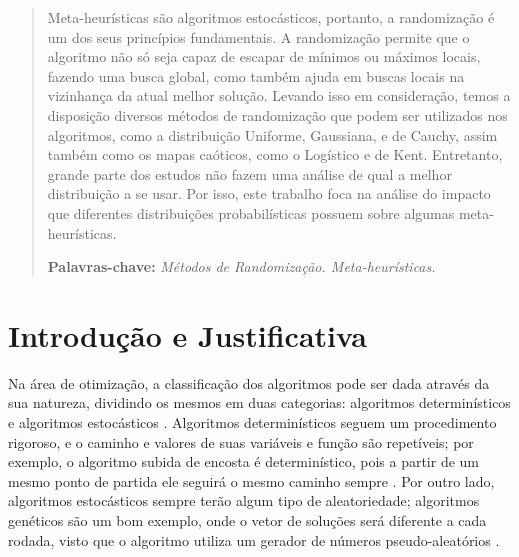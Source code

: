 \documentclass[11pt]{article}
\begin{document}
\begin{abstract}

Meta-heurísticas são algoritmos estocásticos, portanto, a randomização é um dos seus princípios fundamentais. A randomização permite que o algoritmo não só seja capaz de escapar de mínimos ou máximos locais, fazendo uma busca global, como também ajuda em buscas locais na vizinhança da atual melhor solução. Levando isso em consideração, temos a disposição diversos métodos de randomização que podem ser utilizados nos algoritmos, como a distribuição Uniforme, Gaussiana, e de Cauchy, assim também como os mapas caóticos, como o Logístico e de Kent. Entretanto, grande parte dos estudos não fazem uma análise de qual a melhor distribuição a se usar. Por isso, este trabalho foca na análise do impacto que diferentes distribuições probabilísticas possuem sobre algumas meta-heurísticas.

\textbf{Palavras-chave:} \textit{Métodos de Randomização. Meta-heurísticas.}
\end{abstract}

\section{Introdução e Justificativa}
\label{sec:int}


Na área de otimização, a classificação dos algoritmos pode ser dada através da sua natureza, dividindo os mesmos em duas categorias: algoritmos determinísticos e algoritmos estocásticos \cite{yang}. Algoritmos determinísticos seguem um procedimento rigoroso, e o caminho e valores de suas variáveis e função são repetíveis; por exemplo, o algoritmo subida de encosta é determinístico, pois a partir de um mesmo ponto de partida ele seguirá o mesmo caminho sempre \cite{yang}. Por outro lado, algoritmos estocásticos sempre terão algum tipo de aleatoriedade; algoritmos genéticos são um bom exemplo, onde o vetor de soluções será diferente a cada rodada, visto que o algoritmo utiliza um gerador de números pseudo-aleatórios \cite{yang}.
\end{document}

